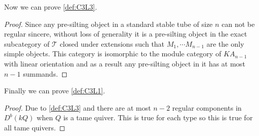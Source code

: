 \indent Now we can prove \ref{def:C3L3}.
\begin{proof}
\indent Since any pre-silting object in a standard stable tube of size $n$ can not be regular sincere, without loss of generality it is a pre-silting object in the exact subcategory of $\mathcal{T}$ closed under extensions such that $M_1,\cdots M_{n-1}$ are the only simple objects. This category is isomorphic to the module category of $KA_{n-1}$ with linear orientation and as a result any pre-silting object in it has at most $n-1$ summands. 
\end{proof}
\indent Finally we can prove \ref{def:C3L1}.
\begin{proof}
\indent Due to \ref{def:C3L3} and \cite{DR76} there are at most $n-2$ regular components in $D^b(kQ)$ when $Q$ is a tame quiver. This is true for each type so this is true for all tame quivers.
\end{proof}
